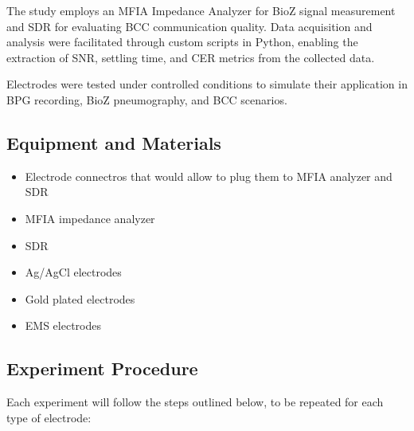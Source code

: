 \documentclass[conference]{IEEEtran}
\begin{document}
The study employs an MFIA Impedance Analyzer for \gls{BioZ} signal measurement and \gls{SDR} for evaluating \gls{BCC} communication quality. Data acquisition and analysis were facilitated through custom scripts in Python, enabling the extraction of SNR, settling time, and \gls{CER} metrics from the collected data.

Electrodes were tested under controlled conditions to simulate their application in BPG recording, \gls{BioZ}   pneumography, and \gls{BCC} scenarios.

\subsection{Equipment and Materials}
\begin{itemize}
    \item Electrode connectros that would allow to plug them to MFIA analyzer and \gls{SDR}
    \item MFIA impedance analyzer
    \item \gls{SDR}
    \item Ag/AgCl electrodes
    \item Gold plated electrodes
    \item \gls{EMS} electrodes
\end{itemize}

\subsection{Experiment Procedure}
Each experiment will follow the steps outlined below, to be repeated for each type of electrode:
\end{document}
